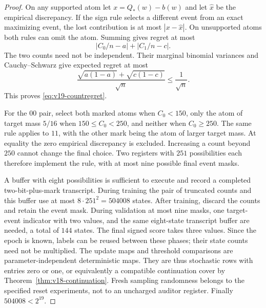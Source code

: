 \begin{proof}
On any supported atom let $x=Q_*(w)-b(w)$ and let $\widehat x$ be the
empirical discrepancy. If the sign rule selects a different event from
an exact maximizing event, the lost contribution is at most
$|x-\widehat x|$. On unsupported atoms both rules can omit the atom.
Summing gives regret at most
\[
 |C_0/n-a|+|C_1/n-c|.
\]
The two counts need not be independent. Their marginal binomial variances
and Cauchy--Schwarz give expected regret at most
\[
 \frac{\sqrt{a(1-a)}+\sqrt{c(1-c)}}{\sqrt n}\le\frac1{\sqrt n}.
\]
This proves \eqref{eq:v19-countregret}.

For the $00$ pair, select both marked atoms when $C_0<150$, only the
atom of target mass $5/16$ when $150\le C_0<250$, and neither when
$C_0\ge250$. The same rule applies to $11$, with the other mark being
the atom of larger target mass. At equality the zero empirical discrepancy
is excluded. Increasing a count beyond $250$ cannot change the final
choice. Two registers with $251$ possibilities each therefore implement
the rule, with at most nine possible final event masks.

A buffer with eight possibilities is sufficient to execute and record a
completed two-bit-plus-mark transcript. During training the pair of
truncated counts and this buffer use at most $8\cdot251^2=504008$ states.
After training, discard the counts and retain the event mask. During
validation at most nine masks, one target-event indicator with two values,
and the same eight-state transcript buffer are needed, a total of $144$
states. The final signed score takes three values. Since the epoch is
known, labels can be reused between these phases; their state counts need
not be multiplied. The update maps and threshold comparisons are
parameter-independent deterministic maps. They are thus stochastic rows
with entries zero or one, or equivalently a compatible continuation cover
by Theorem~\ref{thm:v18-continuation}. Fresh sampling randomness belongs to
the specified reset experiments, not to an uncharged auditor register.
Finally $504008<2^{19}$.
\end{proof}

